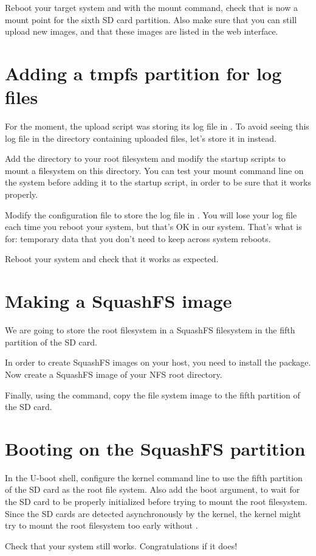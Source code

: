 Reboot your target system and with the mount command, check that
 is now a mount point for the sixth SD card
partition. Also make sure that you can still upload new images, and
that these images are listed in the web interface.

\section{Adding a tmpfs partition for log files}

For the moment, the upload script was storing its log file in
. To avoid seeing this log file in
the directory containing uploaded files, let's store it in
 instead.

Add the  directory to your root filesystem and modify
the startup scripts to mount a  filesystem on this
directory. You can test your  mount command line on the
system before adding it to the startup script, in order to be sure
that it works properly.

Modify the  configuration file to store
the log file in . You will lose your log
file each time you reboot your system, but that's OK in our
system. That's what  is for: temporary data that you don't need
to keep across system reboots.

Reboot your system and check that it works as expected.

\section{Making a SquashFS image}

We are going to store the root filesystem in a SquashFS filesystem in
the fifth partition of the SD card.

In order to create SquashFS images on your host, you need to install
the  package. Now create a SquashFS image of your
NFS root directory.

Finally, using the  command, copy the file system image to
the fifth partition of the SD card.

\section{Booting on the SquashFS partition}

In the U-boot shell, configure the kernel command line to use the
fifth partition of the SD card as the root file system. Also add the
 boot argument, to wait for the SD card to be properly
initialized before trying to mount the root filesystem. Since the SD
cards are detected asynchronously by the kernel, the kernel might try
to mount the root filesystem too early without .

Check that your system still works. Congratulations if it does!
